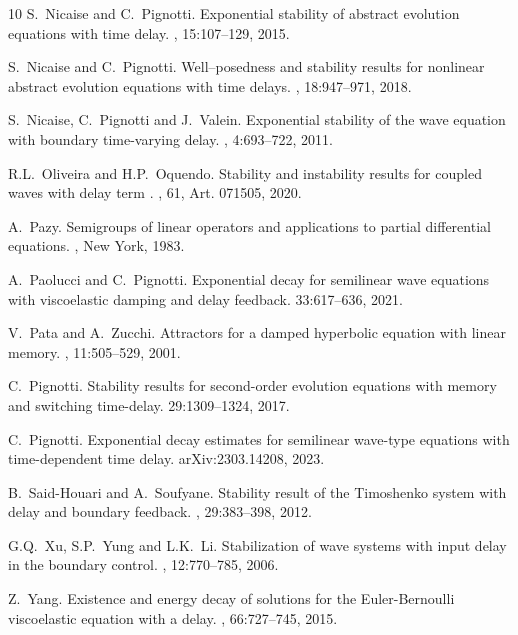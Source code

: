 \documentclass[11pt]{article}
\begin{document}
\begin{thebibliography}{10}
{\sc S.~Nicaise and C.~Pignotti.}
\newblock Exponential stability of abstract evolution equations with time delay.
,  15:107--129, 2015.

{\sc S.~Nicaise and C.~Pignotti.}
\newblock Well--posedness and stability results for nonlinear abstract evolution equations with time delays.
, 18:947--971, 2018.

{\sc S.~Nicaise, C.~Pignotti and J.~Valein.}
\newblock Exponential stability of the wave equation with boundary time-varying delay.
, 4:693--722, 2011.

{\sc R.L.~Oliveira and H.P.~Oquendo.}
\newblock Stability and instability results for coupled waves with delay term .
, 61, Art. 071505,  2020.


{\sc A.~Pazy}.
\newblock Semigroups of linear operators and applications to partial differential equations.
, New York, 1983.

{\sc A.~Paolucci and C.~Pignotti.}
\newblock Exponential decay for semilinear wave equations with
viscoelastic damping and delay feedback.
 33:617--636, 2021.

{\sc V.~Pata and A.~Zucchi.}
\newblock Attractors for a damped hyperbolic equation with linear
memory.
, 11:505--529, 2001.

{\sc C.~Pignotti.}
\newblock
Stability results for second-order evolution equations with memory and switching time-delay.
 29:1309--1324, 2017.

{\sc C.~Pignotti.}
\newblock Exponential decay estimates for semilinear wave-type equations with time-dependent time delay.
 arXiv:2303.14208, 2023.


{\sc B.~Said-Houari and A.~Soufyane.}
\newblock  Stability result of the Timoshenko system with delay and
boundary feedback.
, 29:383--398, 2012.

{\sc G.Q.~Xu, S.P.~Yung and L.K.~Li.}
\newblock  Stabilization of wave systems with input delay in the
boundary control.
, 12:770--785, 2006.

{\sc Z.~Yang}.
\newblock Existence and energy decay of solutions for the Euler-Bernoulli viscoelastic equation with a delay.
, 66:727–745, 2015.

\end{thebibliography}
\end{document}
